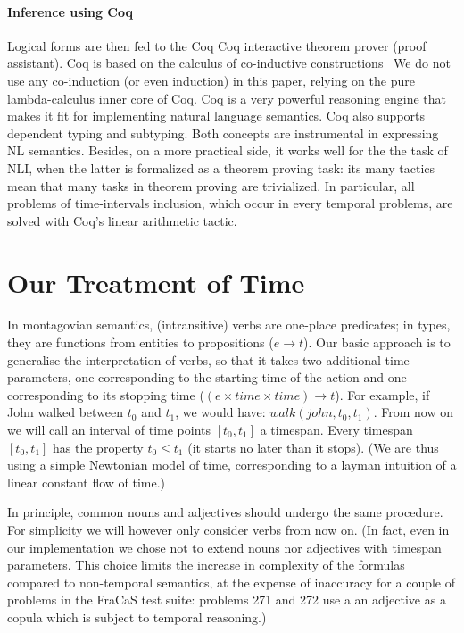 \documentclass[a4paper,11pt]{article}
\begin{document}
\paragraph{Inference using Coq}
Logical forms are then fed to the Coq
Coq interactive theorem prover (proof assistant). Coq is based on
the calculus of co-inductive constructions~\citep{werner_une_1994} We
do not use any co-induction (or even induction) in this paper, relying
on the pure lambda-calculus inner core of Coq.  Coq is a very powerful
reasoning engine that makes it fit for implementing natural language
semantics.  Coq also supports  dependent typing and 
 subtyping. Both concepts are instrumental in expressing NL
semantics\citet{chatzikyriakidis_natural_2014}.  Besides, on a more
practical side, it works well for the the task of NLI, when the latter
is formalized as a theorem proving task: its many tactics mean that
many tasks in theorem proving are trivialized. In particular, all
problems of time-intervals inclusion, which occur in every temporal
problems, are solved with Coq's linear arithmetic tactic.

\section{Our Treatment of Time}
\label{sec:our-semantics}

In montagovian semantics, (intransitive) verbs are one-place
predicates; in types, they are functions from entities to propositions
($e \to t$).  Our basic approach is to generalise the interpretation of 
verbs, so that it takes two
additional time parameters, one corresponding to the starting time
of the action and one corresponding to its stopping time ($(e × time × time) \to t$). For example,
if John walked between $t_0$ and $t_1$, we would have:
$walk(john,t_0,t_1)$. From now on we will call an interval of time
points $[t_0,t_1]$ a timespan. Every timespan $[t_0,t_1]$ has the
property $t_0 ≤ t_1$ (it starts no later than it stops). (We are thus
using a simple Newtonian model of time, corresponding to a layman
intuition of a linear constant flow of time.)

In principle, common nouns and adjectives should undergo the same
procedure. For simplicity we will however only consider verbs from now
on. (In fact, even in our implementation we chose not to extend nouns
nor adjectives with timespan parameters. This choice limits the
increase in complexity of the formulas compared to non-temporal
semantics, at the expense of inaccuracy for a couple of problems in
the FraCaS test suite: problems 271 and 272 use a an adjective as a
copula which is subject to temporal reasoning.)
\end{document}
